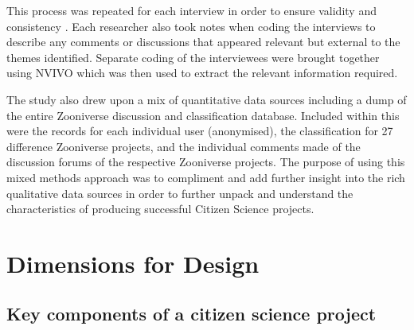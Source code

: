 \documentclass{sigchi}
\begin{document}
This process was repeated for each interview in order to ensure validity and consistency \cite{Strauss, 1987} \cite{Lafaille, 1995}. Each researcher also took notes when coding the interviews to describe any comments or discussions that appeared relevant but external to the themes identified. Separate coding of the interviewees were brought together using NVIVO which was then used to extract the relevant information required.

The study also drew upon a mix of quantitative data sources including a dump of the entire Zooniverse discussion and classification database. Included within this were the records for each individual user (anonymised), the classification for 27 difference Zooniverse projects, and the individual comments made of the discussion forums of the respective Zooniverse projects. The purpose of using this mixed methods approach was to compliment and add further insight into the rich qualitative data sources \cite{Edwards and Crossley, 2009} in order to further unpack and understand the characteristics of producing successful Citizen Science projects.




\section{Dimensions for Design}


\subsection{Key components of a citizen science project}
\end{document}
